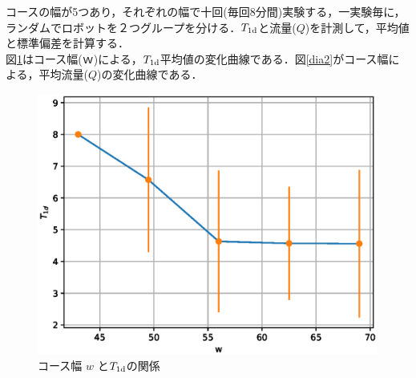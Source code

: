 コースの幅が5つあり，それぞれの幅で十回(毎回8分間)実験する，一実験毎に，ランダムでロボットを２つグループを分ける．$T_{\rm 1d}$と流量($Q$)を計測して，平均値と標準偏差を計算する．\\
図\ref{dia1}はコース幅($ｗ$)による，$T_{\rm 1d}$平均値の変化曲線である．図\ref{dia2}がコース幅による，平均流量($Q$)の変化曲線である．

\vspace{-4mm}
\begin{figure}[!ht]
    \centering
    \includegraphics[width=1.0\linewidth]{diagram3a.eps}
    \caption{コース幅 $w$ と$T_{\rm 1d}$の関係}
    \label{dia1}
\end{figure}

